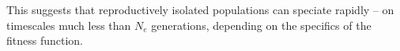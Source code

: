 \documentclass{article}
\newcommand{\1}{\mathbbm{1}}
\newcommand{\fit}{\mathcal{F}}
\begin{document}

This suggests that reproductively isolated populations can speciate rapidly -- on timescales much less than $N_{e}$ generations, depending on the specifics of the fitness function. 


\end{document}
